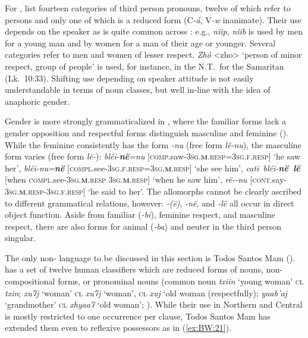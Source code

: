 \documentclass[output=collectionpaper]{langsci/langscibook}
\begin{document}
For , \citet[11]{Hunnn.d.} list fourteen categories of third person pronouns, twelve of which refer to persons and only one of which is a reduced form (C\textit{-á}, V\textit{-w} inanimate). Their use depends on the speaker as is quite common across : e.g., \textit{nîip}, \textit{nîib} is used by men for a young man and by women for a man of their age or younger. Several categories refer to men and women of lesser respect. \textit{Zhó} <zho> ‘person of minor respect, group of people’ is used, for instance, in the N.T.\ for the Samaritan (Lk.~10:33). Shifting use depending on speaker attitude is not easily understandable in terms of noun classes, but well in-line with the idea of anaphoric gender.

Gender is more strongly grammaticalized in , where the familiar forms lack a gender opposition and respectful forms distinguish masculine and feminine (\citealt[363]{Earl2006}). While the feminine consistently has the form \textit{-nu} (free form \textit{lë-nu}), the masculine form varies (free form \textit{lë-\textquotesingle}): \textit{blé\textquotesingle i-\textbf{në\textquotesingle}=nu} [\textsc{comp}.saw-\textsc{3sg.\textbf{m}.resp=3sg.f.resp}] ‘he saw her’, \textit{blé\textquotesingle i-nu=\textbf{në\textquotesingle}} [\textsc{compl}.see-\textsc{3sg.f.resp=3sg.\textbf{m}.resp}] ‘she see him’, \textit{cati\textquotesingle\ blé\textquotesingle i-\textbf{në\textquotesingle\ lë\textquotesingle}} [when \textsc{compl}.see-\textsc{3sg.\textbf{m}.resp} \textsc{3sg.\textbf{m}.resp}] ‘when he saw him’, \textit{rë-\textbf{\textquotesingle}‑nu} [\textsc{cont}.say-\textsc{3sg.\textbf{m}.resp-3sg.f.resp}] ‘he said to her’. The allomorphs cannot be clearly ascribed to different grammatical relations, however: \textit{-(ë)\textquotesingle},  \textit{-në\textquotesingle}, and \textit{-lë\textquotesingle} all occur in direct object function. Aside from familiar (\textit{-bi\textquotesingle}), feminine respect, and masculine respect, there are also forms for animal (\textit{-ba}) and neuter in the third person singular.

The only non- language to be discussed in this section is Todos Santos Mam ().  has a set of twelve human classifiers which are reduced forms of nouns, non-compositional forms, or pronominal nouns (common noun \textit{txiin} ‘young woman’ \textsc{cl} \textit{txin}; \textit{xu7j} ‘woman’ \textsc{cl} \textit{xu7j} ‘woman’, \textsc{cl} \textit{xuj} ‘old woman (respectfully); \textit{yaab’aj} ‘grandmother’ \textsc{cl} \textit{xhyaa7} ‘old woman’; \citealt[158]{England1983}). While their use in Northern and Central  is mostly restricted to one occurrence per clause, Todos Santos Mam has extended them even to reflexive possessors as in (\ref{ex:BW:21}).
\end{document}
